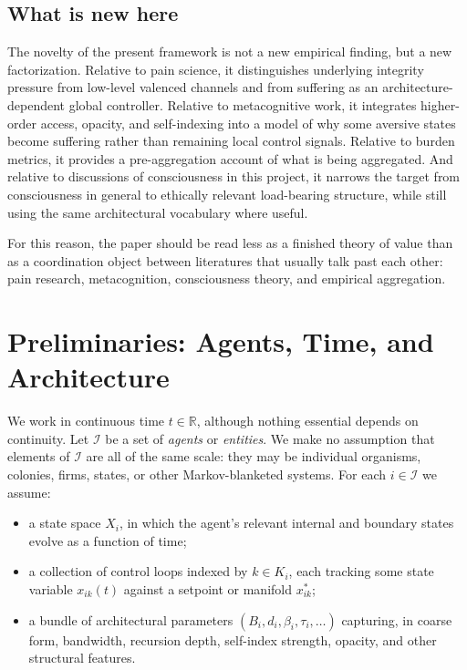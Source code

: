 \documentclass[11pt]{article}
\begin{document}
\subsection{What is new here}

The novelty of the present framework is not a new empirical finding, but a new factorization. Relative to pain science, it distinguishes underlying integrity pressure from low-level valenced channels and from suffering as an architecture-dependent global controller. Relative to metacognitive work, it integrates higher-order access, opacity, and self-indexing into a model of why some aversive states become suffering rather than remaining local control signals. Relative to burden metrics, it provides a pre-aggregation account of what is being aggregated. And relative to discussions of consciousness in this project, it narrows the target from consciousness in general to ethically relevant load-bearing structure, while still using the same architectural vocabulary where useful.

For this reason, the paper should be read less as a finished theory of value than as a coordination object between literatures that usually talk past each other: pain research, metacognition, consciousness theory, and empirical aggregation.


\section{Preliminaries: Agents, Time, and Architecture}

We work in continuous time $t \in \mathbb R$, although nothing essential depends on continuity. Let $\mathcal I$ be a set of \emph{agents} or \emph{entities}. We make no assumption that elements of $\mathcal I$ are all of the same scale: they may be individual organisms, colonies, firms, states, or other Markov-blanketed systems. For each $i \in \mathcal I$ we assume:
\begin{itemize}
  \item a state space $X_i$, in which the agent's relevant internal and boundary states evolve as a function of time;
  \item a collection of control loops indexed by $k \in K_i$, each tracking some state variable $x_{ik}(t)$ against a setpoint or manifold $x^{\ast}_{ik}$;
  \item a bundle of architectural parameters $(B_i,d_i,\beta_i,\tau_i,\dots)$ capturing, in coarse form, bandwidth, recursion depth, self-index strength, opacity, and other structural features.
\end{itemize}
\end{document}

